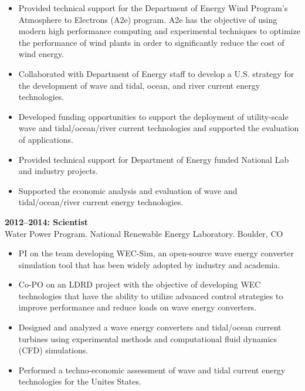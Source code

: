 \begin{itemize}
  \item Provided technical support for the Department of Energy Wind Program’s Atmosphere to Electrons (A2e) program. A2e has the objective of using modern high performance computing and experimental techniques to optimize the performance of wind plants in order to significantly reduce the cost of wind energy.
  \vspace{-0.1in}
  \item Collaborated with Department of Energy staff to develop a U.S. strategy for the development of wave and tidal, ocean, and river current energy technologies.
  \vspace{-0.1in}
  \item Developed funding opportunities to support the deployment of utility-scale wave and tidal/ocean/river current technologies and supported the evaluation of applications.
  \vspace{-0.1in}
  \item Provided technical support for Department of Energy funded National Lab and industry projects.
  \vspace{-0.1in}
  \item Supported the economic analysis and evaluation of wave and tidal/ocean/river current energy technologies.
\end{itemize}
\vspace{-0.2in}
\textbf{2012--2014: Scientist}\\
Water Power Program. National Renewable Energy Laboratory. Boulder, CO\\
\vspace{-0.35in}
\begin{itemize}
  \item PI on the team developing WEC-Sim, an open-source wave energy converter simulation tool that has been widely adopted by industry and academia.
  \vspace{-0.1in}
  \item Co-PO on an LDRD project with the objective of developing WEC technologies that have the ability to utilize advanced control strategies to improve performance and reduce loads on wave energy converters.
  \vspace{-0.1in}
  \item Designed and analyzed a wave energy converters and tidal/ocean current turbines using experimental methods and computational fluid dynamics (CFD) simulations.
  \vspace{-0.1in}
  \item Performed a techno-economic assessment of wave and tidal current energy technologies for the Unites States.
\end{itemize}

